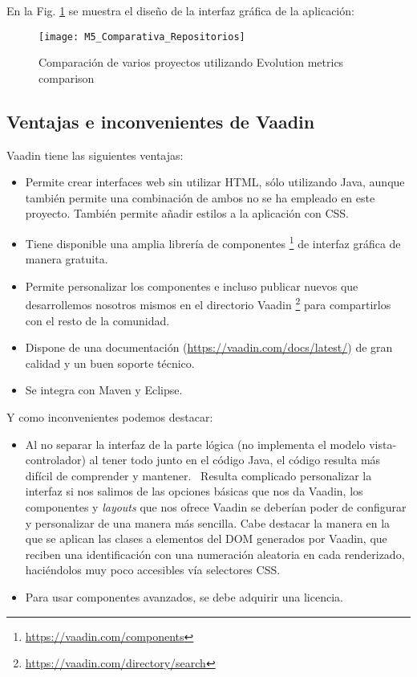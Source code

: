 En la Fig. \ref{fig:M5_Comparativa_Repositorios} se muestra el diseño de la interfaz gráfica de la aplicación:

\begin{figure}[!h]
	\centering
	\texttt{[image: M5\_Comparativa\_Repositorios]}
	\caption{Comparación de varios proyectos utilizando Evolution metrics comparison}\label{fig:M5_Comparativa_Repositorios}
\end{figure}
\FloatBarrier

\newpage
\subsection{Ventajas e inconvenientes de Vaadin}
Vaadin tiene las siguientes ventajas:
\begin{itemize}
	\item Permite crear interfaces web sin utilizar HTML, sólo utilizando Java, aunque también permite una combinación de ambos no se ha empleado en este proyecto. También permite añadir estilos a la aplicación con CSS.
	\item Tiene disponible una amplia librería de componentes \footnote{\url{https://vaadin.com/components}} de interfaz gráfica de manera gratuita.
	\item Permite personalizar los componentes e incluso publicar nuevos que desarrollemos nosotros mismos en el directorio Vaadin \footnote{\url{https://vaadin.com/directory/search}} para compartirlos con el resto de la comunidad.
	\item Dispone de una documentación (\url{https://vaadin.com/docs/latest/}) de gran calidad y un buen soporte técnico.
	\item Se integra con Maven y Eclipse.
\end{itemize}

Y como inconvenientes podemos destacar:
\begin{itemize}
	\item Al no separar la interfaz de la parte lógica (no implementa el modelo vista-controlador) al tener todo junto en el código Java, el código resulta más difícil de comprender y mantener.
	\ Resulta complicado personalizar la interfaz si nos salimos de las opciones básicas que nos da Vaadin, los componentes y \textit{layouts} que nos ofrece Vaadin se deberían poder de configurar y personalizar de una manera más sencilla. Cabe destacar la manera en la que se aplican las clases a elementos del DOM generados por Vaadin, que reciben una identificación con una numeración aleatoria en cada renderizado, haciéndolos muy poco accesibles vía selectores CSS.
	\item Para usar componentes avanzados, se debe adquirir una licencia.
\end{itemize}

